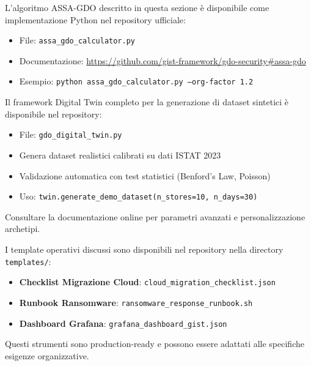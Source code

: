 
\begin{tcolorbox}[colback=blue!5!white,colframe=blue!75!black,title=Implementazione Disponibile]
L'algoritmo ASSA-GDO descritto in questa sezione è disponibile come implementazione Python nel repository ufficiale:
\begin{itemize}
    \item File: \texttt{assa\_gdo\_calculator.py}
    \item Documentazione: \url{https://github.com/gist-framework/gdo-security#assa-gdo}
    \item Esempio: \texttt{python assa\_gdo\_calculator.py --org-factor 1.2}
\end{itemize}
\end{tcolorbox}

\begin{tcolorbox}[colback=green!5!white,colframe=green!75!black,title=Digital Twin Framework]
Il framework Digital Twin completo per la generazione di dataset sintetici è disponibile nel repository:
\begin{itemize}
    \item File: \texttt{gdo\_digital\_twin.py}
    \item Genera dataset realistici calibrati su dati ISTAT 2023
    \item Validazione automatica con test statistici (Benford's Law, Poisson)
    \item Uso: \texttt{twin.generate\_demo\_dataset(n\_stores=10, n\_days=30)}
\end{itemize}
Consultare la documentazione online per parametri avanzati e personalizzazione archetipi.
\end{tcolorbox}

\begin{tcolorbox}[colback=orange!5!white,colframe=orange!75!black,title=Template Operativi]
I template operativi discussi sono disponibili nel repository nella directory \texttt{templates/}:
\begin{itemize}
    \item \textbf{Checklist Migrazione Cloud}: \texttt{cloud\_migration\_checklist.json}
    \item \textbf{Runbook Ransomware}: \texttt{ransomware\_response\_runbook.sh}
    \item \textbf{Dashboard Grafana}: \texttt{grafana\_dashboard\_gist.json}
\end{itemize}
Questi strumenti sono production-ready e possono essere adattati alle specifiche esigenze organizzative.
\end{tcolorbox}


